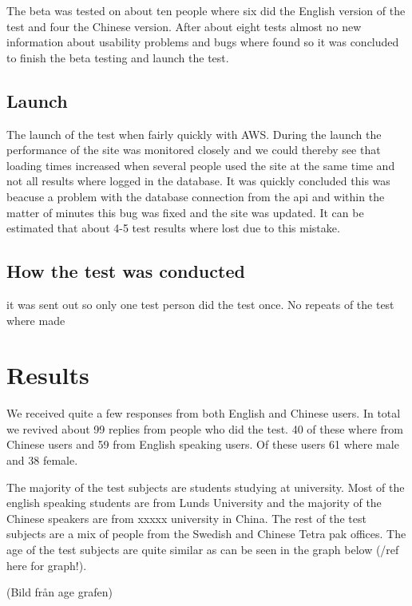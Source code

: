 The beta was tested on about ten people where six did the English version of the test and four the Chinese version. After about eight tests almost no new information about usability problems and bugs where found so it was concluded to finish the beta testing and launch the test.

\subsection{Launch}
The launch of the test when fairly quickly with AWS. During the launch the performance of the site was monitored closely and we could thereby see that loading times increased when several people used the site at the same time and not all results where logged in the database. It was quickly concluded this was beacuse a problem with the database connection from the api and within the matter of minutes this bug was fixed and the site was updated. It can be estimated that about 4-5 test results where lost due to this mistake.

\subsection{How the test was conducted}
it was sent out so only one test person did the test once. No repeats of the test where made

\section{Results}
We received quite a few responses from both English and Chinese users. In total we revived about 99 replies from people who did the test. 40 of these where from Chinese users and 59 from English speaking users. Of these users 61 where male and 38 female.  
 
 The majority of the test subjects are students studying at university. Most of the english speaking students are from Lunds University and the majority of the Chinese speakers are from xxxxx university in China. The rest of the test subjects are a mix of people from the Swedish and Chinese Tetra pak offices.
 The age of the test subjects are quite similar as can be seen in the graph below (/ref here for graph!).
 
(Bild från age grafen)
 

